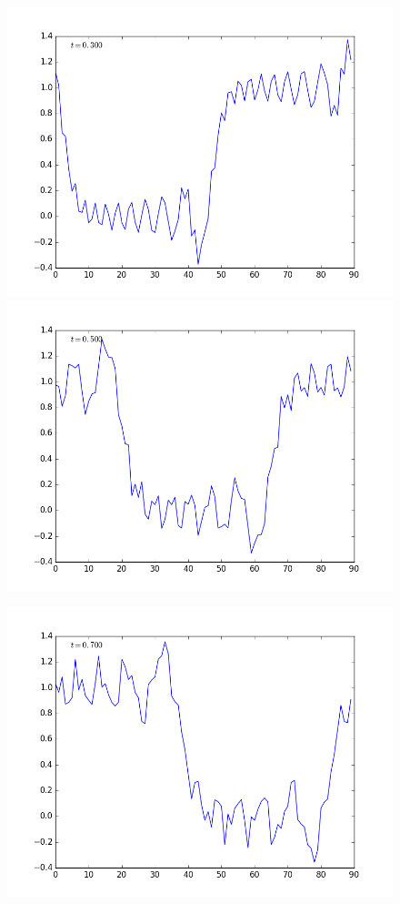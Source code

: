 \documentclass[12pt]{article}
\begin{document}
\begin{enumerate}[(a)]
\begin{figure}[H]
\end{figure} 
\begin{figure}[H]
\includegraphics[scale=0.45]{CN_advection_frames/CN_advection_fig05.png}
\includegraphics[scale=0.45]{CN_advection_frames/CN_advection_fig07.png}
\end{figure} 
\begin{figure}[H]
\includegraphics[scale=0.45]{CN_advection_frames/CN_advection_fig09.png}

\end{figure}
\end{enumerate}
\end{document}
